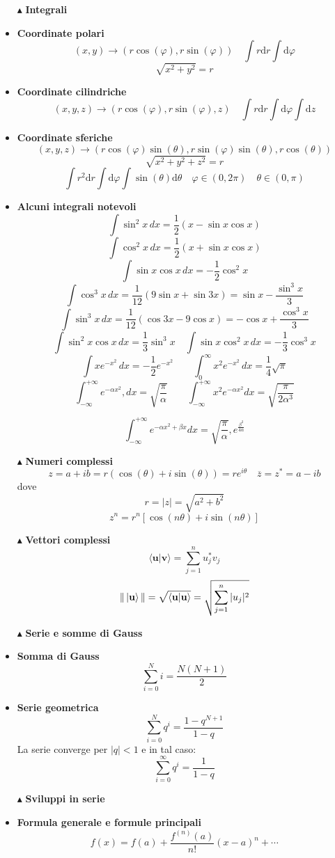 \documentclass{book}
\newcommand{\g}{\textbf}
\newcommand{\e}{\begin{equation}}
\newcommand{\ex}{\end{equation} }
\renewcommand{\it}{\item[$\cdot$]}
\begin{document}
\begin{multicols}{4}
\begin{itemize}
\item [$\blacktriangle$] \g{Integrali}
\it \g{Coordinate polari}
\e{(x,y) \rightarrow (r\cos(\varphi), r\sin(\varphi)) \quad \int r \text{d}r\int \text{d}\varphi}\ex
\e{\sqrt{x^{2}+y^{2}} = r}\ex
\it \g{Coordinate cilindriche}
\e{(x,y,z) \rightarrow (r\cos(\varphi),r\sin(\varphi),z) \quad \int r \text{d}r\int \text{d}\varphi\int \text{d}z }\ex
\it \g{Coordinate sferiche}
\e{(x,y,z) \rightarrow (r\cos(\varphi)\sin(\theta),r\sin(\varphi)\sin(\theta),r\cos(\theta))  }\ex
\e{\sqrt{x^{2}+y^{2}+z^{2}} = r}\ex
\e{\int r^{2} \text{d}r\int \text{d}\varphi\int \sin(\theta)\text{d}\theta \quad \varphi \in (0,2\pi) \quad \theta \in (0,\pi)}\ex
    \it \g{Alcuni integrali notevoli}
        \e{\int \sin^2x \, dx = \frac{1}{2}(x - \sin x \cos x)} \ex
        \e{\int \cos^2x \, dx = \frac{1}{2}(x + \sin x \cos x) }\ex \e{ \int \sin x \cos x \, dx = -\frac{1}{2}\cos^2x} \ex
        \e{\int \cos^3x \, dx = \frac{1}{12}(9\sin x + \sin 3x) = \sin x - \frac{\sin^3x}{3}} \ex
        \e{\int \sin^3x \, dx = \frac{1}{12}(\cos 3x - 9\cos x) = -\cos x + \frac{\cos^3x}{3}} \ex
        \e{\int \sin^2x \cos x \, dx = \frac{1}{3}\sin^3x \quad \int \sin x \cos^2x \, dx = -\frac{1}{3}\cos^3x} \ex
        \e{\int x e^{-x^2} \, dx = -\frac{1}{2} e^{-x^2} \qquad \int_0^\infty x^2 e^{-x^2} \, dx = \frac{1}{4} \sqrt{\pi}} \ex
       \e{ \int_{-\infty}^{+\infty} e^{-\alpha x^2} , dx = \sqrt{\frac{\pi}{\alpha}} \qquad \int_{-\infty}^{+\infty} x^2 e^{-\alpha x^2} dx = \sqrt{\frac{\pi}{2\alpha^3}} }\ex

\e{\int_{-\infty}^{+\infty} e^{-\alpha x^2 + \beta x}  dx = \sqrt{\frac{\pi}{\alpha}} , e^{\frac{\beta^2}{4\alpha}}} \ex

        \item [$\blacktriangle$] \g{Numeri complessi}
        \e{z = a + ib = r(\cos(\theta) + i\sin(\theta)) = re^{i\theta} \quad \overline{z} = z^{*} = a - ib}\ex
        dove 
        \e{r = |z| = \sqrt{a^{2}+b^{2}} }\ex
        \e{z^n = r^n \left[ \cos(n\theta) + i\sin(n\theta) \right]}\ex
        \item [$\blacktriangle$] \g{Vettori complessi} 
        \e{\langle \mathbf{u} | \mathbf{v} \rangle = \sum_{j=1}^n u_j^* v_j}\ex
        \e{\|\ket{\mathbf{u}}\| = \sqrt{\langle \mathbf{u} | \mathbf{u} \rangle} = \sqrt{\sum_{j=1}^n |u_j|^2}
}\ex
\item [$\blacktriangle$] \g{Serie e somme di Gauss}
    \it \g{Somma di Gauss}
        \e{\sum_{i=0}^N i = \frac{N(N + 1)}{2}} \ex
    \it \g{Serie geometrica}
        \e{\sum_{i=0}^N q^i = \frac{1 - q^{N+1}}{1 - q}} \ex
        La serie converge per $|q| < 1$ e in tal caso:
        \e{\sum_{i=0}^\infty q^i = \frac{1}{1 - q}} \ex
\item [$\blacktriangle$] \g{Sviluppi in serie}
\it \g{Formula generale e formule principali}
\e{f(x) = f(a) + \frac{f^{(n)}(a)}{n!}(x - a)^n + \cdots}\ex
   

\end{itemize}
\end{multicols}
\end{document}
